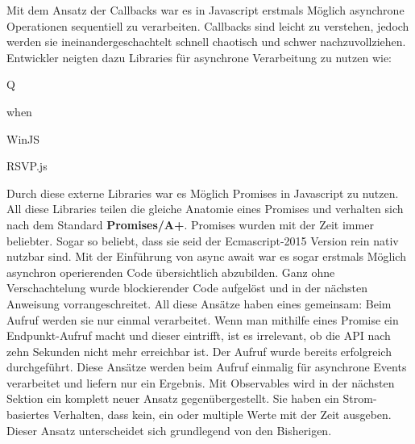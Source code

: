 Mit dem Ansatz der Callbacks war es in Javascript erstmals Möglich asynchrone Operationen sequentiell zu verarbeiten. Callbacks sind leicht zu verstehen, jedoch werden sie ineinandergeschachtelt schnell chaotisch und schwer nachzuvollziehen. Entwickler neigten dazu Libraries für asynchrone Verarbeitung zu nutzen wie:

\begin{description}
\item Q
\item when
\item WinJS
\item RSVP.js
\end{description}

\noindent
Durch diese externe Libraries war es Möglich Promises in Javascript zu nutzen. All diese Libraries teilen die gleiche Anatomie eines Promises und verhalten sich nach dem Standard \textbf{Promises/A+}\cite{promises-a+}. Promises wurden mit der Zeit immer beliebter. Sogar so beliebt, dass sie seid der Ecmascript-2015 Version rein nativ nutzbar sind. Mit der Einführung von async await war es sogar erstmals Möglich asynchron operierenden Code übersichtlich abzubilden. Ganz ohne Verschachtelung wurde blockierender Code aufgelöst und in der nächsten Anweisung vorrangeschreitet. All diese Ansätze haben eines gemeinsam: Beim Aufruf werden sie nur einmal verarbeitet. Wenn man mithilfe eines Promise ein Endpunkt-Aufruf macht und dieser eintrifft, ist es irrelevant, ob die API nach zehn Sekunden nicht mehr erreichbar ist. Der Aufruf wurde bereits erfolgreich durchgeführt. Diese Ansätze werden beim Aufruf einmalig für asynchrone Events verarbeitet und liefern nur ein Ergebnis. Mit Observables wird in der nächsten Sektion ein komplett neuer Ansatz gegenübergestellt. Sie haben ein Strom-basiertes Verhalten, dass kein, ein oder multiple Werte mit der Zeit ausgeben. Dieser Ansatz unterscheidet sich grundlegend von den Bisherigen.
